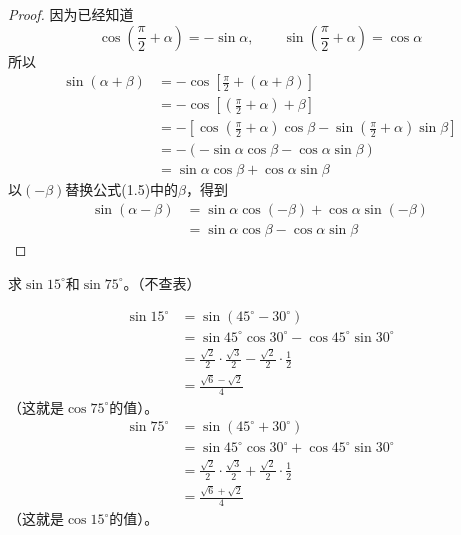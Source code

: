 \begin{proof}
因为已经知道
\[\cos\left(\frac{\pi}{2}+\alpha\right)=-\sin\alpha,\qquad \sin\left(\frac{\pi}{2}+\alpha\right)=\cos\alpha\]
所以
\[\begin{split}
 \sin(\alpha+\beta) &=-\cos\left[\frac{\pi}{2}+(\alpha+\beta)\right]\\
 &=-\cos\left[\left(\frac{\pi}{2}+\alpha\right)+\beta\right]\\
&=-\left[\cos\left(\frac{\pi}{2}+\alpha\right)\cos\beta-\sin\left(\frac{\pi}{2}+\alpha\right)\sin\beta\right]\\    
&=-\left(-\sin\alpha\cos\beta-\cos\alpha\sin\beta\right)\\
&=\sin\alpha\cos\beta+\cos\alpha\sin\beta
\end{split}\]
以$(-\beta)$替换公式(1.5)中的$\beta$，得到
\[\begin{split}
  \sin(\alpha-\beta)&=\sin\alpha\cos(-\beta)+\cos\alpha\sin(-\beta)\\
  &=\sin\alpha\cos\beta-\cos\alpha\sin\beta  
\end{split}\]
\end{proof}

\begin{example}
    求$\sin15^{\circ}$和$\sin75^{\circ}$。（不查表）
\end{example}

\begin{solution}
    \[\begin{split}
        \sin 15^{\circ}&=\sin (45^{\circ}-30^{\circ})\\
        &=\sin45^{\circ}\cos30^{\circ}-\cos45^{\circ}\sin30^{\circ}\\
        &=\frac{\sqrt{2}}{2}\cdot\frac{\sqrt{3}}{2}-\frac{\sqrt{2}}{2}\cdot\frac{1}{2}\\
        &=\frac{\sqrt{6}-\sqrt{2}}{4}
    \end{split}\]
    （这就是$\cos75^{\circ}$的值）。
    \[\begin{split}
        \sin 75^{\circ}&=\sin (45^{\circ}+30^{\circ})\\
        &=\sin45^{\circ}\cos30^{\circ}+\cos45^{\circ}\sin30^{\circ}\\
        &=\frac{\sqrt{2}}{2}\cdot\frac{\sqrt{3}}{2}+\frac{\sqrt{2}}{2}\cdot\frac{1}{2}\\
        &=\frac{\sqrt{6}+\sqrt{2}}{4}  
    \end{split}\]
    （这就是$\cos15^{\circ}$的值）。
\end{solution}

